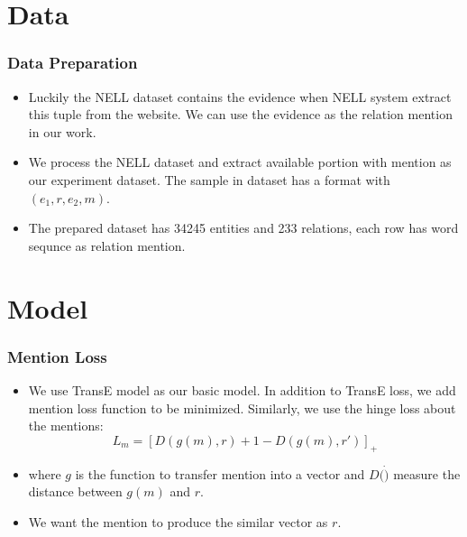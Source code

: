 \documentclass[pdf,10pt]{beamer}
\begin{document}
\section{Data}
\begin{frame}
\frametitle{Data Preparation}
    \begin{itemize}
        \item Luckily the NELL dataset contains the evidence when NELL system extract this tuple from the website. We can use the evidence as the relation mention in our work.
        \item We process the NELL dataset and extract available portion with mention as our experiment dataset. The sample in dataset has a format with $(e_1, r, e_2, m)$.
        \item The prepared  dataset has 34245 entities and 233 relations, each row has word sequnce as relation mention.
    \end{itemize}
\end{frame}

\section{Model}
\begin{frame}
    \frametitle{Mention Loss}
    \begin{itemize}
        \item We use TransE model as our basic model. In addition to TransE loss, we add mention loss function to be minimized. Similarly, we use the hinge loss about the mentions:
            $$L_m=[D(g(m), r) + 1 - D(g(m), r')]_+$$
        \item where $g$ is the function to transfer mention into a vector and $D(\dot)$ measure the distance between $g(m)$ and $r$. 
        \item We want the mention to produce the similar vector as $r$. 
    \end{itemize}
\end{frame}
\end{document}
